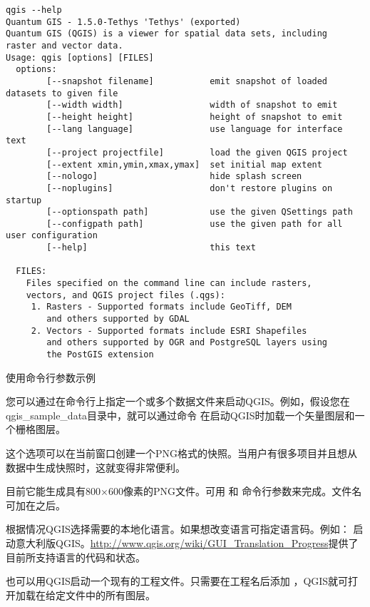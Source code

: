 \small
\begin{verbatim}
qgis --help
Quantum GIS - 1.5.0-Tethys 'Tethys' (exported)
Quantum GIS (QGIS) is a viewer for spatial data sets, including
raster and vector data.
Usage: qgis [options] [FILES]
  options:
        [--snapshot filename]           emit snapshot of loaded datasets to given file
        [--width width]                 width of snapshot to emit
        [--height height]               height of snapshot to emit
        [--lang language]               use language for interface text
        [--project projectfile]         load the given QGIS project
        [--extent xmin,ymin,xmax,ymax]  set initial map extent
        [--nologo]                      hide splash screen
        [--noplugins]                   don't restore plugins on startup
        [--optionspath path]            use the given QSettings path
        [--configpath path]             use the given path for all user configuration
        [--help]                        this text

  FILES:
    Files specified on the command line can include rasters,
    vectors, and QGIS project files (.qgs):
     1. Rasters - Supported formats include GeoTiff, DEM
        and others supported by GDAL
     2. Vectors - Supported formats include ESRI Shapefiles
        and others supported by OGR and PostgreSQL layers using
        the PostGIS extension
\end{verbatim}
\normalsize

\begin{Tip} \caption{\textsc{使用命令行参数示例}}
您可以通过在命令行上指定一个或多个数据文件来启动QGIS。例如，假设您在qgis\_sample\_data目录中，就可以通过命令 在启动QGIS时加载一个矢量图层和一个栅格图层。
\end{Tip}

这个选项可以在当前窗口创建一个PNG格式的快照。当用户有很多项目并且想从数据中生成快照时，这就变得非常便利。

目前它能生成具有800×600像素的PNG文件。可用 和 命令行参数来完成。文件名可加在之后。

根据情况QGIS选择需要的本地化语言。如果想改变语言可指定语言码。例如： 启动意大利版QGIS。\url{http://www.qgis.org/wiki/GUI_Translation_Progress}提供了目前所支持语言的代码和状态。

也可以用QGIS启动一个现有的工程文件。只需要在工程名后添加 ，QGIS就可打开加载在给定文件中的所有图层。

